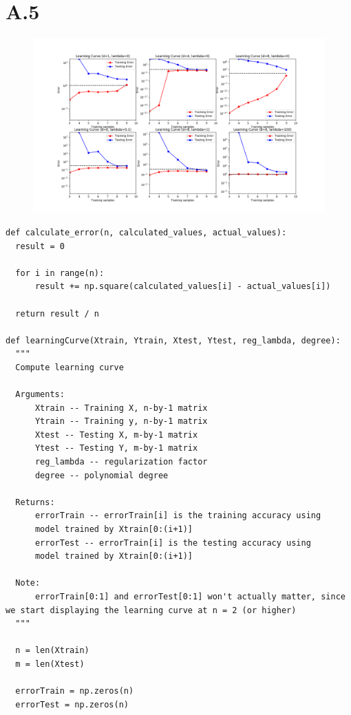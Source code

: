 \documentclass{article}
\newcommand{\1}{\mathbf{1}}
\begin{document}
\section*{A.5}
{\Large 

\begin{figure}[ht!]
  \centering
  \includegraphics[width=215mm]{../hw1-code/results/a5.png}
\end{figure}

\begin{verbatim}
def calculate_error(n, calculated_values, actual_values):
  result = 0

  for i in range(n):
      result += np.square(calculated_values[i] - actual_values[i])

  return result / n

def learningCurve(Xtrain, Ytrain, Xtest, Ytest, reg_lambda, degree):
  """
  Compute learning curve

  Arguments:
      Xtrain -- Training X, n-by-1 matrix
      Ytrain -- Training y, n-by-1 matrix
      Xtest -- Testing X, m-by-1 matrix
      Ytest -- Testing Y, m-by-1 matrix
      reg_lambda -- regularization factor
      degree -- polynomial degree

  Returns:
      errorTrain -- errorTrain[i] is the training accuracy using
      model trained by Xtrain[0:(i+1)]
      errorTest -- errorTrain[i] is the testing accuracy using
      model trained by Xtrain[0:(i+1)]

  Note:
      errorTrain[0:1] and errorTest[0:1] won't actually matter, since we start displaying the learning curve at n = 2 (or higher)
  """

  n = len(Xtrain)
  m = len(Xtest)

  errorTrain = np.zeros(n)
  errorTest = np.zeros(n)


\end{verbatim}}
\end{document}

